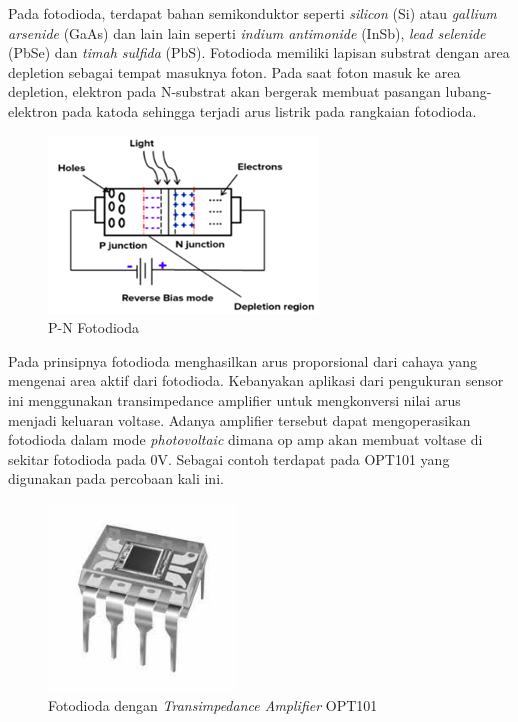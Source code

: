 Pada fotodioda, terdapat bahan semikonduktor seperti \textit{silicon} (Si) atau \textit{gallium
arsenide} (GaAs) dan lain lain seperti \textit{indium antimonide} (InSb), \textit{lead selenide}
(PbSe) dan \textit{timah sulfida} (PbS). Fotodioda memiliki lapisan substrat dengan area depletion
sebagai tempat masuknya foton. Pada saat foton masuk ke area depletion, elektron pada N-substrat
akan bergerak membuat pasangan lubang-elektron pada katoda sehingga terjadi arus listrik pada
rangkaian fotodioda\cite{Vlasov2023}.

\begin{figure}[H]
    \centering
    \includegraphics{Images/Bias Fotodioda.png}
    \caption{P-N Fotodioda}
    \label{fig:p-n photodiode}
\end{figure}

Pada prinsipnya fotodioda menghasilkan arus proporsional dari cahaya yang mengenai area aktif dari
fotodioda. Kebanyakan aplikasi dari pengukuran sensor ini menggunakan transimpedance amplifier
untuk mengkonversi nilai arus menjadi keluaran voltase. Adanya amplifier tersebut dapat
mengoperasikan fotodioda dalam mode \textit{photovoltaic} dimana op amp akan membuat voltase di
sekitar fotodioda pada 0V. Sebagai contoh terdapat pada OPT101 yang digunakan pada percobaan kali
ini.

\begin{figure}[H]
    \centering
    \includegraphics[width=5cm]{Images/OPT101.jpg}
    \caption{Fotodioda dengan \textit{Transimpedance Amplifier} OPT101}
    \label{fig:opt101}
\end{figure}




